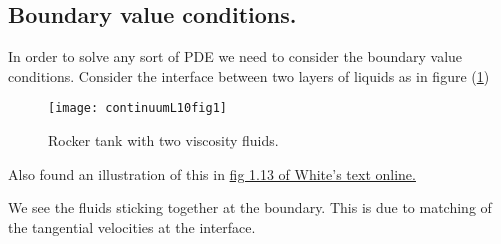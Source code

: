 \subsection{Boundary value conditions.}

In order to solve any sort of PDE we need to consider the boundary value conditions.  Consider the interface between two layers of liquids as in figure (\ref{fig:continuumL9:continuumL10fig1})

\begin{figure}[htp]
   \centering
   \texttt{[image: continuumL10fig1]}
   \caption{Rocker tank with two viscosity fluids.}\label{fig:continuumL9:continuumL10fig1}
\end{figure}

Also found an illustration of this in \href{watinst.ut.ac.ir/downloads/pdf/ebooks/white.pdf}{fig 1.13 of White's text online.}

We see the fluids sticking together at the boundary.  This is due to matching of the tangential velocities at the interface.

\EndArticle
